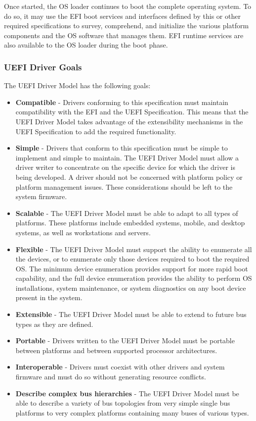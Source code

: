 Once started, the OS loader continues to boot the complete operating system. To do so, it
may use the EFI boot services and interfaces defined by this or other required specifications to
survey, comprehend, and initialize the various platform components and the OS software that
manages them. EFI runtime services are also available to the OS loader during the boot phase.

\subsubsection{UEFI Driver Goals}
The UEFI Driver Model has the following goals:
\begin{itemize}
	\item \textbf{Compatible} - Drivers conforming to this specification must maintain compatibility with the EFI and the UEFI Specification. This means that the UEFI Driver Model takes advantage of the extensibility mechanisms in the UEFI Specification to add the required
	functionality.
	\item \textbf{Simple} - Drivers that conform to this specification must be simple to implement and	simple to maintain. The UEFI Driver Model must allow a driver writer to concentrate on
	the specific device for which the driver is being developed. A driver should not be
	concerned with platform policy or platform management issues. These considerations
	should be left to the system firmware.
	\item \textbf{Scalable} - The UEFI Driver Model must be able to adapt to all types of platforms. These platforms include embedded systems, mobile, and desktop systems, as well as workstations and servers.
	\item \textbf{Flexible} - The UEFI Driver Model must support the ability to enumerate all the devices, or to enumerate only those devices required to boot the required OS. The minimum device
	enumeration provides support for more rapid boot capability, and the full device enumeration provides the ability to perform OS installations, system maintenance, or system diagnostics on any boot device present in the system.
	\item \textbf{Extensible} - The UEFI Driver Model must be able to extend to future bus types as they
	are defined.

	\item \textbf{Portable} - Drivers written to the UEFI Driver Model must be portable between platforms and between supported processor architectures.
	\item \textbf{Interoperable} - Drivers must coexist with other drivers and system firmware and must do so without generating resource conflicts.
	\item \textbf{Describe complex bus hierarchies} - The UEFI Driver Model must be able to describe a variety of bus topologies from very simple single bus platforms to very complex platforms
	containing many buses of various types.


\end{itemize}
